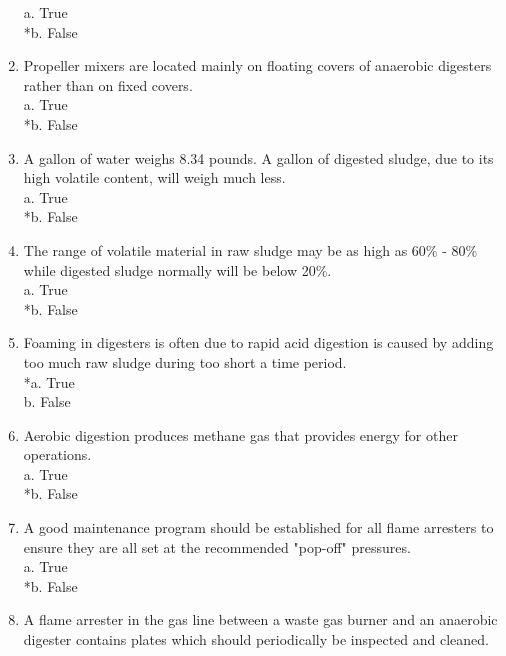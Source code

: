\begin{enumerate}
a. True \\
*b. False \\

\item  Propeller mixers are located mainly on floating covers of anaerobic digesters rather than on fixed covers. \\

a. True \\
*b. False \\

\item  A gallon of water weighs 8.34 pounds.  A gallon of digested sludge, due to its high volatile content, will weigh much less. \\

a. True \\
*b. False \\

\item  The range of volatile material in raw sludge may be as high as 60\% - 80\% while digested sludge normally will be below 20\%. \\

a. True \\
*b. False \\

\item  Foaming in digesters is often due to rapid acid digestion is caused by adding too much raw sludge during too short a time period. \\

*a. True \\
b. False \\

\item  Aerobic digestion produces methane gas that provides energy for other operations. \\

a. True \\
*b. False \\

\item  A good maintenance program should be established for all flame arresters to ensure they are all set at the recommended "pop-off" pressures. \\

a. True \\
*b. False \\

\item  A flame arrester in the gas line between a waste gas burner and an anaerobic digester contains plates which should periodically be inspected and cleaned. \\


\end{enumerate}
